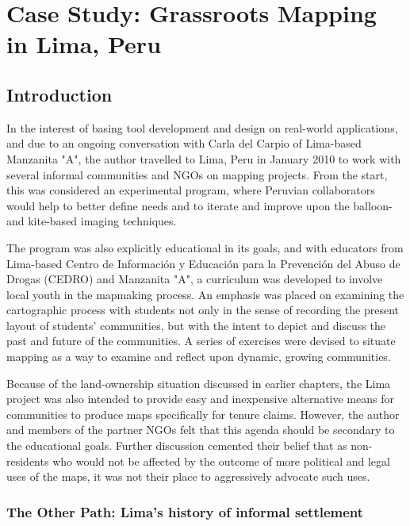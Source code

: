 \documentclass[11pt]{report}
\begin{document}
\chapter{Case Study: Grassroots Mapping in Lima, Peru}

\section{Introduction}

In the interest of basing tool development and design on real-world applications, and due to an ongoing conversation with Carla del Carpio of Lima-based Manzanita "A", the author travelled to Lima, Peru in January 2010 to work with several informal communities and NGOs on mapping projects. From the start, this was considered an experimental program, where Peruvian collaborators would help to better define needs and to iterate and improve upon the balloon- and kite-based imaging techniques.

The program was also explicitly educational in its goals, and with educators from Lima-based Centro de Información y Educación para la Prevención del Abuso de Drogas (CEDRO) and Manzanita "A", a curriculum was developed to involve local youth in the mapmaking process. An emphasis was placed on examining the cartographic process with students not only in the sense of recording the present layout of students' communities, but with the intent to depict and discuss the past and future of the communities. A series of exercises were devised to situate mapping as a way to examine and reflect upon dynamic, growing communities.

Because of the land-ownership situation discussed in earlier chapters, the Lima project was also intended to provide easy and inexpensive alternative means for communities to produce maps specifically for tenure claims. However, the author and members of the partner NGOs felt that this agenda should be secondary to the educational goals. Further discussion cemented their belief that as non-residents who would not be affected by the outcome of more political and legal uses of the maps, it was not their place to aggressively advocate such uses. 

\subsection{The Other Path: Lima's history of informal settlement}
\end{document}
